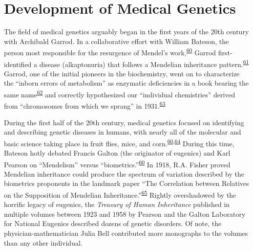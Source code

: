 \documentclass[11pt,letterpaper,oneside]{book}
\begin{document}
\hypertarget{medGen}{%
\section{Development of Medical Genetics}\label{medGen}}

The field of medical genetics arguably began in the first years of the 20th century with Archibald Garrod.
In a collaborative effort with William Bateson, the person most responsible for the resurgence of Mendel's work,\textsuperscript{\protect\hyperlink{ref-harper:2008aa}{60}} Garrod first-identified a disease (alkaptonuria) that follows a Mendelian inheritance pattern.\textsuperscript{\protect\hyperlink{ref-garrod:1902aa}{61}}
Garrod, one of the initial pioneers in the biochemistry, went on to characterize the ``inborn errors of metabolism'' as enzymatic deficiencies in a book bearing the same name\textsuperscript{\protect\hyperlink{ref-garrod:1923aa}{62}} and correctly hypothesized our ``individual chemistries'' derived from ``chromosomes from which we sprang'' in 1931.\textsuperscript{\protect\hyperlink{ref-garrod:1931aa}{63}}

During the first half of the 20th century, medical genetics focused on identifying and describing genetic diseases in humans, with nearly all of the molecular and basic science taking place in fruit flies, mice, and corn.\textsuperscript{\protect\hyperlink{ref-harper:2008aa}{60},\protect\hyperlink{ref-rimoin:2004aa}{64}}
During this time, Bateson hotly debated Francis Galton (the originator of eugenics) and Karl Pearson on ``Mendelism'' versus ``biometrics.''\textsuperscript{\protect\hyperlink{ref-harper:2008aa}{60}}
In 1918, R.A. Fisher proved Mendelian inheritance could produce the spectrum of variation described by the biometrics proponents in the landmark paper ``The Correlation between Relatives on the Supposition of Mendelian Inheritance.''\textsuperscript{\protect\hyperlink{ref-fisher:1919aa}{65}}
Rightly overshadowed by the horrific legacy of eugenics, the \emph{Treasury of Human Inheritance} published in multiple volumes between 1923 and 1958 by Pearson and the Galton Laboratory for National Eugenics described dozens of genetic disorders.
Of note, the physician-mathematician Julia Bell contributed more monographs to the volumes than any other individual.
\end{document}
